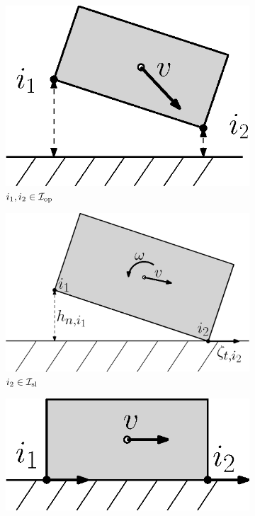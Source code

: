 \documentclass[../DC2017114Bouma.tex]{subfiles}
\begin{document}
\begin{figure}[h]
\centering
\begin{subfigure}[b]{0.17\textwidth}
\centering
\includegraphics[width=\textwidth]{example1.eps}
\caption{$i_1,i_2\in\mathcal{I}_{\text{op}}$}
\label{fig:2example1}
\end{subfigure}
\quad
\begin{subfigure}[b]{0.17\textwidth}  
\centering 
\includegraphics[width=\textwidth]{example2.eps}
\caption{$i_2\in\mathcal{I}_{\text{sl}}$}
\label{fig:2example2}
\end{subfigure}
\quad
\begin{subfigure}[b]{0.17\textwidth}   
\centering 
\includegraphics[width=\textwidth]{example3.eps}

\end{subfigure}
\end{figure}
\end{document}
